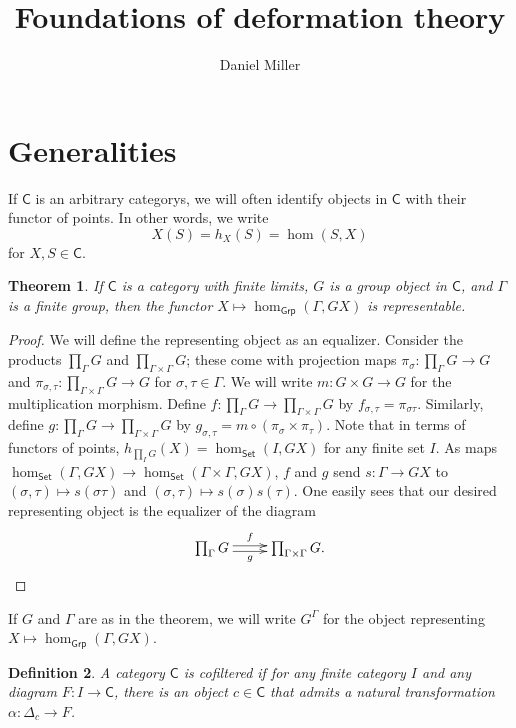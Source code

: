 \documentclass{article}
\title{Foundations of deformation theory}
\author{Daniel Miller}
\newcommand{\cat}{\mathsf{C}}
\newcommand{\grp}{\mathsf{Grp}}
\newcommand{\set}{\mathsf{Set}}
\newtheorem{theorem}{Theorem}
\newtheorem{definition}[theorem]{Definition}
\numberwithin{theorem}{section}
\begin{document}
\maketitle










\section{Generalities}

If $\cat$ is an arbitrary categorys, we will often  identify objects in $\cat$ 
with their functor of points. In other words, we write 
\[
  X(S) = h_X(S) = \hom(S,X)
\]
for $X,S\in\cat$. 

\begin{theorem}
If $\cat$ is a category with finite limits, $G$ is a group object in $\cat$, 
and $\Gamma$ is a finite group, then the functor 
$X\mapsto \hom_\grp(\Gamma,G X)$ is representable. 
\end{theorem}
\begin{proof}
We will define the representing object as an equalizer. Consider the products 
$\prod_\Gamma G$ and $\prod_{\Gamma\times \Gamma} G$; these come with 
projection maps $\pi_\sigma:\prod_\Gamma G\to G$ and 
$\pi_{\sigma,\tau}:\prod_{\Gamma\times\Gamma} G\to G$ for 
$\sigma,\tau\in\Gamma$. We will write $m:G\times G\to G$ for the 
multiplication morphism. Define 
$f:\prod_\Gamma G\to \prod_{\Gamma\times\Gamma} G$ by 
$f_{\sigma,\tau} = \pi_{\sigma\tau}$. Similarly, define 
$g:\prod_\Gamma G\to\prod_{\Gamma\times\Gamma} G$ by 
$g_{\sigma,\tau} = m\circ (\pi_\sigma\times\pi_\tau)$. Note that in terms of 
functors of points, $h_{\prod_I G}(X)=\hom_\set(I, G X)$ for any finite set 
$I$. As maps $\hom_\set(\Gamma,G X)\to \hom_\set(\Gamma\times\Gamma,G X)$, $f$ 
and $g$ send $s:\Gamma\to G X$ to $(\sigma,\tau)\mapsto s(\sigma\tau)$ 
and $(\sigma,\tau)\mapsto s(\sigma)s(\tau)$. One easily sees that our desired 
representing object is the equalizer of the diagram 
\[\xymatrix{
  \prod_\Gamma G \ar@<2pt>[r]^-{f} \ar@<-2pt>[r]_-{g}
    & \prod_{\Gamma\times\Gamma} G\text{.}
}\]
\end{proof}

If $G$ and $\Gamma$ are as in the theorem, we will write $G^\Gamma$ for the 
object representing $X\mapsto \hom_\grp(\Gamma, G X)$. 

\begin{definition}
A category $\cat$ is \emph{cofiltered} if for any finite category $I$ and any 
diagram $F:I\to \cat$, there is an object $c\in\cat$ that admits a natural 
transformation $\alpha:\Delta_c\to F$.
\end{definition}
\end{document}
